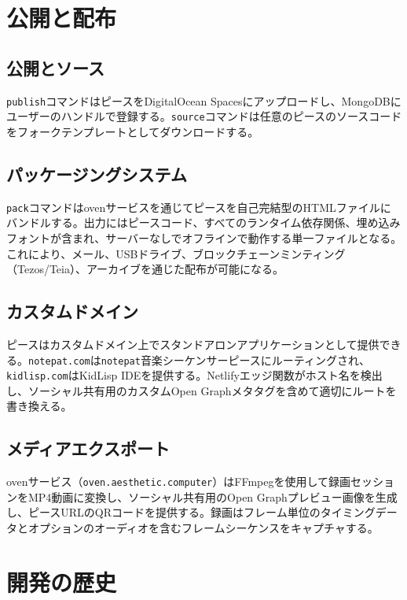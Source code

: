 \documentclass[10pt,letterpaper,twocolumn]{article}
\begin{document}
\section{公開と配布}
\label{sec:publishing}

\subsection{公開とソース}

\texttt{publish}コマンドはピースをDigitalOcean Spacesにアップロードし、MongoDBにユーザーのハンドルで登録する。\texttt{source}コマンドは任意のピースのソースコードをフォークテンプレートとしてダウンロードする。

\subsection{パッケージングシステム}

\texttt{pack}コマンドはovenサービスを通じてピースを自己完結型のHTMLファイルにバンドルする。出力にはピースコード、すべてのランタイム依存関係、埋め込みフォントが含まれ、サーバーなしでオフラインで動作する単一ファイルとなる。これにより、メール、USBドライブ、ブロックチェーンミンティング（Tezos/Teia）、アーカイブを通じた配布が可能になる。

\subsection{カスタムドメイン}

ピースはカスタムドメイン上でスタンドアロンアプリケーションとして提供できる。\texttt{notepat.com}は\texttt{notepat}音楽シーケンサーピースにルーティングされ、\texttt{kidlisp.com}はKidLisp IDEを提供する。Netlifyエッジ関数がホスト名を検出し、ソーシャル共有用のカスタムOpen Graphメタタグを含めて適切にルートを書き換える。

\subsection{メディアエクスポート}

ovenサービス（\texttt{oven.aesthetic.computer}）はFFmpegを使用して録画セッションをMP4動画に変換し、ソーシャル共有用のOpen Graphプレビュー画像を生成し、ピースURLのQRコードを提供する。録画はフレーム単位のタイミングデータとオプションのオーディオを含むフレームシーケンスをキャプチャする。


\section{開発の歴史}
\label{sec:history}
\end{document}
